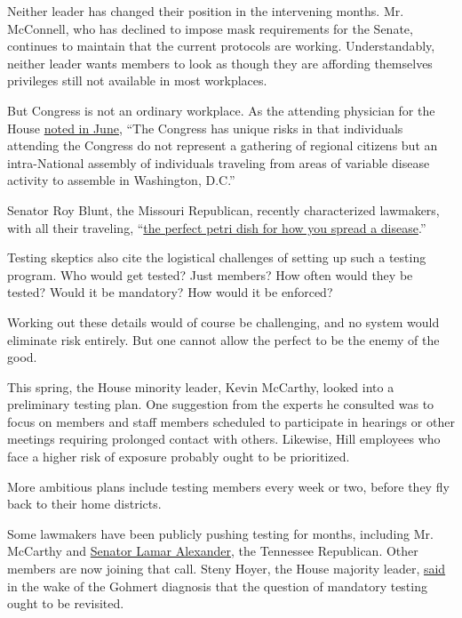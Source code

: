 Neither leader has changed their position in the intervening months. Mr.
McConnell, who has declined to impose mask requirements for the Senate,
continues to maintain that the current protocols are working.
Understandably, neither leader wants members to look as though they are
affording themselves privileges still not available in most workplaces.

But Congress is not an ordinary workplace. As the attending physician
for the House
\href{https://www.rollcall.com/2020/06/17/face-masks-required-in-house-committee-hearings-congressional-physician-says/}{noted
in June}, ``The Congress has unique risks in that individuals attending
the Congress do not represent a gathering of regional citizens but an
intra-National assembly of individuals traveling from areas of variable
disease activity to assemble in Washington, D.C.''

Senator Roy Blunt, the Missouri Republican, recently characterized
lawmakers, with all their traveling,
``\href{https://www.nytimes3xbfgragh.onion/2020/07/29/us/politics/louie-gohmert-positive-coronavirus-mask.html}{the
perfect petri dish for how you spread a disease}.''

Testing skeptics also cite the logistical challenges of setting up such
a testing program. Who would get tested? Just members? How often would
they be tested? Would it be mandatory? How would it be enforced?

Working out these details would of course be challenging, and no system
would eliminate risk entirely. But one cannot allow the perfect to be
the enemy of the good.

This spring, the House minority leader, Kevin McCarthy, looked into a
preliminary testing plan. One suggestion from the experts he consulted
was to focus on members and staff members scheduled to participate in
hearings or other meetings requiring prolonged contact with others.
Likewise, Hill employees who face a higher risk of exposure probably
ought to be prioritized.

More ambitious plans include testing members every week or two, before
they fly back to their home districts.

Some lawmakers have been publicly pushing testing for months, including
Mr. McCarthy and
\href{https://www.timesfreepress.com/news/local/story/2020/may/06/sen-alexander-congressional-leaders-should-ta/522336/}{Senator
Lamar Alexander}, the Tennessee Republican. Other members are now
joining that call. Steny Hoyer, the House majority leader,
\href{https://www.rollcall.com/2020/07/29/louie-gohmert-coronavirus-capitol/}{said}
in the wake of the Gohmert diagnosis that the question of mandatory
testing ought to be revisited.

